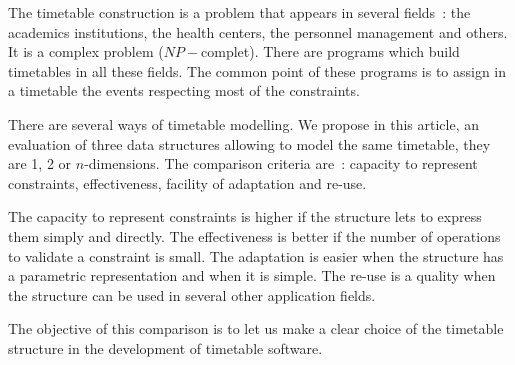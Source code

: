 The timetable construction is a problem that appears in several
fields~: the academics institutions, the health centers, the
personnel management and others. It is a complex problem
($NP-$complet). There are programs which  build timetables in all
these fields. The common point of these programs is to assign in a
timetable the events respecting most of the constraints.

There are several ways of timetable modelling. We propose in this
article, an evaluation of three data structures allowing to model
the same timetable, they are 1, 2 or $n$-dimensions. The
comparison criteria are~: capacity to represent constraints,
effectiveness, facility of adaptation and re-use.

The capacity to represent constraints is higher if the structure
lets to express them simply and directly. The effectiveness is
better if the number of operations to validate a constraint is
small. The adaptation is easier when the structure has a
parametric representation and when it is simple. The re-use is a
quality when the structure can be used in several other
application fields.

The objective of this comparison is to let us make a clear choice
of the timetable structure in the development of timetable
software.
